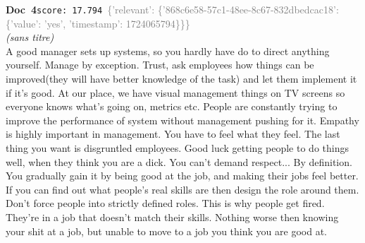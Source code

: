 \documentclass[a4paper,11pt]{article}
\begin{document}
\begin{docenv}
{\footnotesize\textcolor{doccolor}{\textbf{Doc~4}}}\hfill{\tiny\texttt{score:~17.794}}\ {\tiny\textcolor{gray}{\{'relevant': \{'868c6e58-57c1-48ee-8c67-832dbedcac18': \{'value': 'yes', 'timestamp': 1724065794\}\}\}}}\\[3pt]
{\small\textit{(sans titre)}}\\[2pt]
\vspace{2pt}
{\footnotesize 
A good manager sets up systems, so you hardly have do to direct anything yourself. Manage by exception. Trust,  ask employees how things can be improved(they will have better knowledge of the task) and let them implement it if it's good.  At our place,  we have visual management things on TV screens so everyone knows what's going on,  metrics etc.  People are constantly trying to improve the performance of system without management pushing for it.   Empathy is highly important in management.  You have to feel what they feel.  The last thing you want is disgruntled employees.  Good luck getting people to do things well,  when they think you are a dick.   You can't demand respect... By definition.  You gradually gain it by being good at the job,  and making their jobs feel better.  If you can find out what people's real skills are then design the role around them. Don't force people into strictly defined roles. This is why people get fired. They're in a job that doesn't match their skills. Nothing worse then knowing your shit at a job,  but unable to move to a job you think you are good at.}
\end{docenv}
\end{document}
